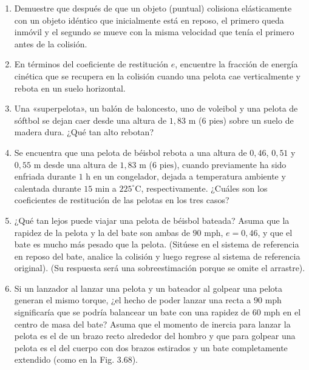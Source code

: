 \documentclass[12pt]{book}
\begin{document}
\begin{enumerate}
\subsection*{Golpeo y patada de pelotas}

\item[3.153] Demuestre que después de que un objeto (puntual) colisiona elásticamente con un objeto idéntico que inicialmente está en reposo, el primero queda inmóvil y el segundo se mueve con la misma velocidad que tenía el primero antes de la colisión.

\item[3.154] En términos del coeficiente de restitución $e$, encuentre la fracción de energía cinética que se recupera en la colisión cuando una pelota cae verticalmente y rebota en un suelo horizontal.

\item[3.155] Una «superpelota», un balón de baloncesto, uno de voleibol y una pelota de sóftbol se dejan caer desde una altura de $1{,}83\text{ m}$ ($6\text{ pies}$) sobre un suelo de madera dura. ¿Qué tan alto rebotan?

\item[3.156] Se encuentra que una pelota de béisbol rebota a una altura de $0{,}46$, $0{,}51$ y $0{,}55\text{ m}$ desde una altura de $1{,}83\text{ m}$ ($6\text{ pies}$), cuando previamente ha sido enfriada durante $1\text{ h}$ en un congelador, dejada a temperatura ambiente y calentada durante $15\text{ min}$ a $225^\circ\text{C}$, respectivamente. ¿Cuáles son los coeficientes de restitución de las pelotas en los tres casos?~\cite{ref66}

\item[3.157] ¿Qué tan lejos puede viajar una pelota de béisbol bateada? Asuma que la rapidez de la pelota y la del bate son ambas de $90\text{ mph}$, $e = 0{,}46$, y que el bate es mucho más pesado que la pelota. (Sitúese en el sistema de referencia en reposo del bate, analice la colisión y luego regrese al sistema de referencia original). (Su respuesta será una sobreestimación porque se omite el arrastre).

\item[3.158] Si un lanzador al lanzar una pelota y un bateador al golpear una pelota generan el mismo torque, ¿el hecho de poder lanzar una recta a $90\text{ mph}$ significaría que se podría balancear un bate con una rapidez de $60\text{ mph}$ en el centro de masa del bate? Asuma que el momento de inercia para lanzar la pelota es el de un brazo recto alrededor del hombro y que para golpear una pelota es el del cuerpo con dos brazos estirados y un bate completamente extendido (como en la Fig. 3.68).


\end{enumerate}
\end{document}
